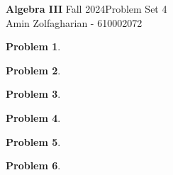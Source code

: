 \documentclass[12pt]{article}
\newcommand{\customanswer}[1]{%
\begin{problem}
\end{problem}

}
\newtheorem{problem}{Problem}
\begin{document}
\noindent \textbf{Algebra III} Fall 2024\hfill Problem Set 4\\
Amin Zolfagharian - 610002072

\hrulefill

\customanswer{1}
\customanswer{2}
\customanswer{3}
\customanswer{4}
\customanswer{5}
\customanswer{6}
\end{document}
